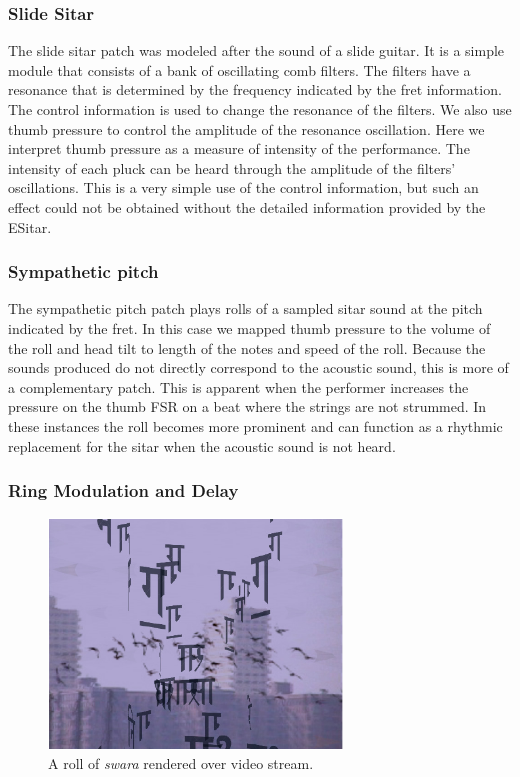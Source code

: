 \subsubsection{Slide Sitar}

The slide sitar patch was modeled after the sound of a slide guitar. It is a
simple module that consists of a bank of oscillating comb filters. The filters
have a resonance that is determined by the frequency indicated by the fret
information. The control information is used to change the resonance of the
filters. We also use thumb pressure to control the amplitude of the resonance
oscillation. Here we interpret thumb pressure as a measure of intensity of the
performance. The intensity of each pluck can be heard through the amplitude of
the filters' oscillations. This is a very simple use of the control information,
but such an effect could not be obtained without the detailed information
provided by the ESitar.

\subsubsection{Sympathetic pitch}

The sympathetic pitch patch plays rolls of a sampled sitar sound at the pitch
indicated by the fret. In this case we mapped thumb pressure to the volume of the
roll and head tilt to length of the notes and speed of the roll. Because the
sounds produced do not directly correspond to the acoustic sound, this is more of
a complementary patch. This is apparent when the performer increases the pressure
on the thumb FSR on a beat where the strings are not strummed. In these instances
the roll becomes more prominent and can function as a rhythmic replacement for
the sitar when the acoustic sound is not heard.

\subsubsection{Ring Modulation and Delay}


\begin{figure}[t]
\centering
\includegraphics[width=78mm]{img-8-eps-converted-to-crop.pdf}      
\caption{A roll of \textit{swara} rendered over video stream.}
\label{Kapur:img-8}       %
\end{figure}



